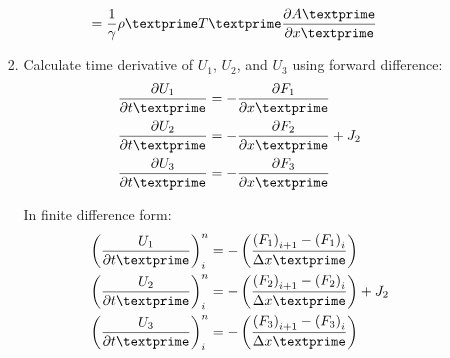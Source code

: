 \documentclass[12pt]{article}
\begin{document}
\begin{enumerate}
\begin{enumerate}
\begin{enumerate}
\begin{align}
						&= \frac{1}{\gamma}\rho\textprime T\textprime\frac{\partial A\textprime}{\partial x\textprime}
				\end{align}
			\item Calculate time derivative of $U_1$, $U_2$, and $U_3$ using forward difference:
				\begin{align}
					\frac{\partial U_1}{\partial t\textprime} &= - \frac{\partial F_1}{\partial x\textprime}\\
					\frac{\partial U_2}{\partial t\textprime} &= - \frac{\partial F_2}{\partial x\textprime} + J_2 \\
					\frac{\partial U_3}{\partial t\textprime} &= - \frac{\partial F_3}{\partial x\textprime}
				\end{align}
				\par In finite difference form:
				\begin{align}
					\left(\frac{U_1}{\partial t\textprime}\right)_{i}^{n} &= -\left(\frac{\left(F_{1}\right)_{i+1} - \left(F_{1}\right)_{i}}{\Delta x\textprime}\right) \\
					\left(\frac{U_2}{\partial t\textprime}\right)_{i}^{n} &= -\left(\frac{\left(F_{2}\right)_{i+1} - \left(F_{2}\right)_{i}}{\Delta x\textprime}\right) + J_2 \\
					\left(\frac{U_3}{\partial t\textprime}\right)_{i}^{n} &= -\left(\frac{\left(F_{3}\right)_{i+1} - \left(F_{3}\right)_{i}}{\Delta x\textprime}\right)
				\end{align}


\end{enumerate}
\end{enumerate}
\end{enumerate}
\end{document}
